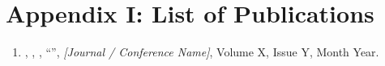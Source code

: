 
\newpage
\chapter*{Appendix I: List of Publications}

\begin{enumerate}[label={\arabic*.}]

    \item \textbf{\AuthorOne}, \textbf{\AuthorTwo}, \textbf{\AuthorThree}, ``\ProjectTitle'',
    \textit{[Journal / Conference Name]}, Volume X, Issue Y, Month Year.


\end{enumerate}
